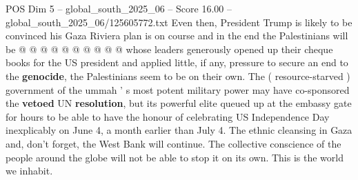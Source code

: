 \begin{textsample}{POS Dim 5 – global\_south\_2025\_06 – Score 16.00 – global\_south\_2025\_06/125605772.txt}
Even then, President Trump is likely to be convinced his Gaza Riviera plan is on course and in the end the Palestinians will be @ @ @ @ @ @ @ @ @ @ whose leaders generously opened up their cheque books for the US president and applied little, if any, pressure to secure an end to the \textbf{genocide}, the Palestinians seem to be on their own.
The ( resource-starved ) government of the ummah ' s most potent military power may have co-sponsored the \textbf{vetoed} UN \textbf{resolution}, but its powerful elite queued up at the embassy gate for hours to be able to have the honour of celebrating US Independence Day inexplicably on June 4, a month earlier than July 4.
The ethnic cleansing in Gaza and, don't forget, the West Bank will continue.
The collective conscience of the people around the globe will not be able to stop it on its own.
This is the world we inhabit.

\end{textsample}

